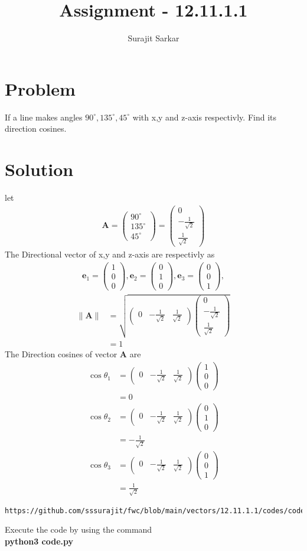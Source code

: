 \documentclass[journal,12pt,twocolumn]{IEEEtran}
\title{\mytitle}
\title{
Assignment - 12.11.1.1
}
\author{Surajit Sarkar}
\newcommand{\myvec}[1]{\ensuremath{\begin{pmatrix}#1\end{pmatrix}}}
\providecommand{\norm}[1]{\lVert#1\rVert}
\let\vec\mathbf
\begin{document}
\maketitle
\tableofcontents
\bigskip
\section{\textbf{Problem}}
If a line makes angles $90^{\circ},135^{\circ},45^{\circ}$ with x,y and z-axis respectivly. Find its direction cosines.
\section{\textbf{Solution}}
let
\begin{align}
\vec{A}=\myvec{90^{\circ}\\135^{\circ}\\45^{\circ}}=\myvec{0\\-\frac{1}{\sqrt{2}}\\ \frac{1}{\sqrt{2}}}
\end{align}
The Directional vector of x,y and z-axis are respectivly as
\begin{align}
\vec{e}_1=\myvec{1\\0\\0},\vec{e}_2=\myvec{0\\1\\0},\vec{e}_3=\myvec{0\\0\\1},
\end{align}
\begin{align}
\norm{\vec{A}}&=\sqrt{\myvec{0&-\frac{1}{\sqrt{2}}&\frac{1}{\sqrt{2}}}\myvec{0\\-\frac{1}{\sqrt{2}}\\\frac{1}{\sqrt{2}}}}\\
&=1
\end{align}
The Direction cosines of vector $\vec{A}$ are
\begin{align}
\cos\theta_1&=\myvec{0&-\frac{1}{\sqrt{2}}&\frac{1}{\sqrt{2}}}\myvec{1\\0\\0}\\
&=0
\end{align}
\begin{align}
\cos\theta_2&=\myvec{0&-\frac{1}{\sqrt{2}}&\frac{1}{\sqrt{2}}}\myvec{0\\1\\0}\\
&=-\frac{1}{\sqrt{2}}
\end{align}
\begin{align}
\cos\theta_3&=\myvec{0&-\frac{1}{\sqrt{2}}&\frac{1}{\sqrt{2}}}\myvec{0\\0\\1}\\
&=\frac{1}{\sqrt{2}}
\end{align}
\begin{lstlisting}
https://github.com/sssurajit/fwc/blob/main/vectors/12.11.1.1/codes/code.py
\end{lstlisting}
Execute the code by using the command\\
\textbf{python3 code.py}
\end{document}
